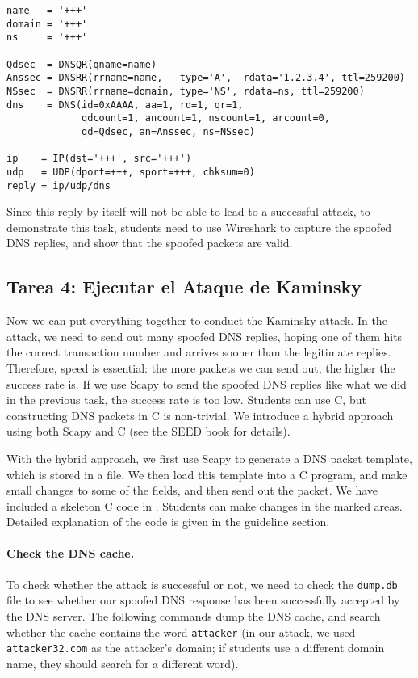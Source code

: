 \begin{lstlisting}
name   = '+++'  
domain = '+++'  
ns     = '+++'

Qdsec  = DNSQR(qname=name)
Anssec = DNSRR(rrname=name,   type='A',  rdata='1.2.3.4', ttl=259200)
NSsec  = DNSRR(rrname=domain, type='NS', rdata=ns, ttl=259200)
dns    = DNS(id=0xAAAA, aa=1, rd=1, qr=1,
             qdcount=1, ancount=1, nscount=1, arcount=0,
             qd=Qdsec, an=Anssec, ns=NSsec)

ip    = IP(dst='+++', src='+++')
udp   = UDP(dport=+++, sport=+++, chksum=0)
reply = ip/udp/dns
\end{lstlisting}
 

Since this reply by itself will not be able to lead to a successful 
attack, to demonstrate this task, students need to 
use Wireshark to capture the spoofed DNS replies, and 
show that the spoofed packets are valid. 


\subsection{Tarea 4: Ejecutar el Ataque de Kaminsky}   

Now we can put everything together to conduct the Kaminsky attack. 
In the attack, we need to send out many spoofed DNS replies, hoping 
one of them hits the correct transaction number and arrives sooner
than the legitimate replies. Therefore, speed is essential: the more packets 
we can send out, the higher the success rate is. If we use 
Scapy to send the spoofed DNS replies like what we did in the 
previous task, the success rate is too low. Students can use 
C, but constructing DNS packets in C is non-trivial. 
We introduce a hybrid approach using both Scapy and C (see the SEED
book for details). 


With the hybrid approach, we first use Scapy to generate 
a DNS packet template, which is stored in a file. 
We then load this template into a C program, and make 
small changes to some of the fields, and then send 
out the packet. 
We have included a skeleton C code
in . 
Students can make changes
in the marked areas. Detailed explanation
of the code is given in the 
guideline section.


\paragraph{Check the DNS cache.}
To check whether the attack is successful or not, we need to 
check the {\tt dump.db} file to see whether our spoofed DNS
response has been successfully accepted by the DNS server. 
The following commands dump the DNS cache, and search whether
the cache contains the word \texttt{attacker} (in our 
attack, we used \texttt{attacker32.com} as the attacker's 
domain; if students use a different domain name, they should 
search for a different word).  

